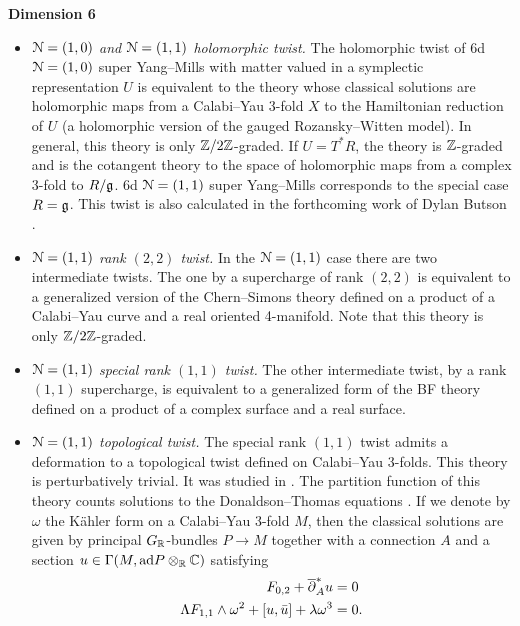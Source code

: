 \documentclass[10pt, oneside]{article}
\begin{document}
\textbf{Dimension 6}
\begin{itemize}
 \item \emph{$\mathcal{N}=(1,0)$ and $\mathcal{N}=(1,1)$ holomorphic twist.} The holomorphic twist of 6d $\mathcal N=(1, 0)$ super Yang--Mills with matter valued in a symplectic representation $U$ is equivalent to the theory whose classical solutions are holomorphic maps from a Calabi--Yau 3-fold $X$ to the Hamiltonian reduction of $U$ (a holomorphic version of the gauged Rozansky--Witten model). In general, this theory is only $\mathbb Z/2\mathbb Z$-graded. If $U=T^*R$, the theory is $\mathbb Z$-graded and is the cotangent theory to the space of holomorphic maps from a complex 3-fold to $R/\mathfrak g$. 6d $\mathcal N=(1, 1)$ super Yang--Mills corresponds to the special case $R=\mathfrak g$. This twist is also calculated in the forthcoming work of Dylan Butson \cite{Butson}.
 \item \emph{$\mathcal{N}=(1,1)$ rank $(2, 2)$ twist.} In the $\mathcal{N}=(1,1)$ case there are two intermediate twists. The one by a supercharge of rank $(2, 2)$ is equivalent to a generalized version of the Chern--Simons theory defined on a product of a Calabi--Yau curve and a real oriented 4-manifold. Note that this theory is only $\mathbb Z/2\mathbb Z$-graded.
 \item \emph{$\mathcal{N}=(1,1)$ special rank $(1,1)$ twist.} The other intermediate twist, by a rank $(1, 1)$ supercharge, is equivalent to a generalized form of the BF theory defined on a product of a complex surface and a real surface.
 \item \emph{$\mathcal{N}=(1,1)$ topological twist.} The special rank $(1, 1)$ twist admits a deformation to a topological twist defined on Calabi--Yau 3-folds. This theory is perturbatively trivial. It was studied in \cite{AcharyaOLoughlinSpence, BaulieuKannoSinger}. The partition function of this theory counts solutions to the Donaldson--Thomas equations \cite{Thomas}. If we denote by $\omega$ the K\"ahler form on a Calabi--Yau 3-fold $M$, then the classical solutions are given by principal $G_\mathbb R$-bundles $P\rightarrow M$ together with a connection $A$ and a section $u\in\Gamma(M, \mathrm{ad} P\otimes_\mathbb R \mathbb C)$ satisfying
\begin{align*}
F_{0, 2} + \overline{\partial}^*_A u &= 0 \\
\Lambda F_{1, 1}\wedge \omega^2 + [u, \bar{u}] + \lambda \omega^3 &= 0.
\end{align*}
\end{itemize}
\end{document}
